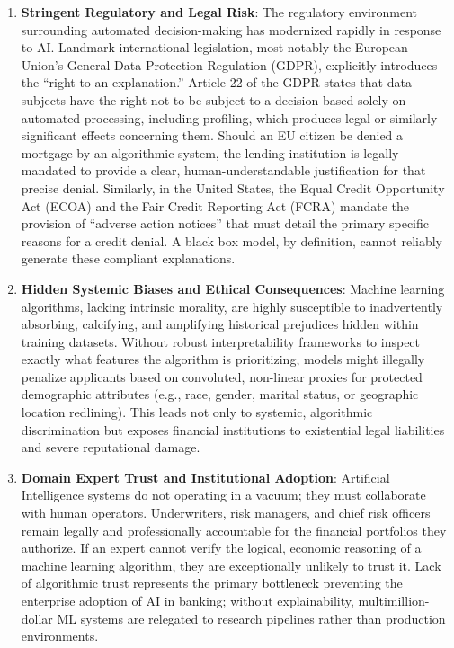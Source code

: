 \begin{enumerate}
\def\labelenumi{\arabic{enumi}.}
\item
  \textbf{Stringent Regulatory and Legal Risk}: The regulatory
  environment surrounding automated decision-making has modernized
  rapidly in response to AI. Landmark international legislation, most
  notably the European Union's General Data Protection Regulation
  (GDPR), explicitly introduces the ``right to an explanation.'' Article
  22 of the GDPR states that data subjects have the right not to be
  subject to a decision based solely on automated processing, including
  profiling, which produces legal or similarly significant effects
  concerning them. Should an EU citizen be denied a mortgage by an
  algorithmic system, the lending institution is legally mandated to
  provide a clear, human-understandable justification for that precise
  denial. Similarly, in the United States, the Equal Credit Opportunity
  Act (ECOA) and the Fair Credit Reporting Act (FCRA) mandate the
  provision of ``adverse action notices'' that must detail the primary
  specific reasons for a credit denial. A black box model, by
  definition, cannot reliably generate these compliant explanations.
\item
  \textbf{Hidden Systemic Biases and Ethical Consequences}: Machine
  learning algorithms, lacking intrinsic morality, are highly
  susceptible to inadvertently absorbing, calcifying, and amplifying
  historical prejudices hidden within training datasets. Without robust
  interpretability frameworks to inspect exactly what features the
  algorithm is prioritizing, models might illegally penalize applicants
  based on convoluted, non-linear proxies for protected demographic
  attributes (e.g., race, gender, marital status, or geographic location
  redlining). This leads not only to systemic, algorithmic
  discrimination but exposes financial institutions to existential legal
  liabilities and severe reputational damage.
\item
  \textbf{Domain Expert Trust and Institutional Adoption}: Artificial
  Intelligence systems do not operating in a vacuum; they must
  collaborate with human operators. Underwriters, risk managers, and
  chief risk officers remain legally and professionally accountable for
  the financial portfolios they authorize. If an expert cannot verify
  the logical, economic reasoning of a machine learning algorithm, they
  are exceptionally unlikely to trust it. Lack of algorithmic trust
  represents the primary bottleneck preventing the enterprise adoption
  of AI in banking; without explainability, multimillion-dollar ML
  systems are relegated to research pipelines rather than production
  environments.
\end{enumerate}

